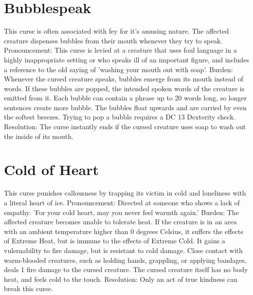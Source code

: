\documentclass[10pt,a4paper,twoside,twocolumn,openany,bg=print,nodeprecatedcode]{dndbook}
\begin{document}
\section{Bubblespeak}
This curse is often associated with fey for it's amusing nature. The affected creature dispenses bubbles from their mouth whenever they try to speak.
Pronouncement: This curse is levied at a creature that uses foul language in a highly inappropriate setting or who speaks ill of an important figure, and includes a reference to the old saying of 'washing your mouth out with soap'.
Burden: Whenever the cursed creature speaks, bubbles emerge from its mouth instead of words. If these bubbles are popped, the intended spoken words of the creature is emitted from it. Each bubble can contain a phrase up to 20 words long, so longer sentences create more bubble. The bubbles float upwards and are carried by even the softest breezes. Trying to pop a bubble requires a DC 13 Dexterity check.
Resolution: The curse instantly ends if the cursed creature uses soap to wash out the inside of its mouth.
\section{Cold of Heart}
This curse punishes callousness by trapping its victim in cold and loneliness with a literal heart of ice.
Pronouncement: Directed at someone who shows a lack of empathy. 'For your cold heart, may you never feel warmth again.'
Burden: The affected creature becomes unable to tolerate heat. If the creature is in an area with an ambient temperature higher than 0 degrees Celsius, it suffers the effects of Extreme Heat, but is immune to the effects of Extreme Cold. It gains a vulernability to fire damage, but is resistant to cold damage. Close contact with warm-blooded creatures, such as holding hands, grappling, or applying bandages, deals 1 fire damage to the cursed creature. The cursed creature itself has no body heat, and feels cold to the touch.
Resolution: Only an act of true kindness can break this curse.
\end{document}
